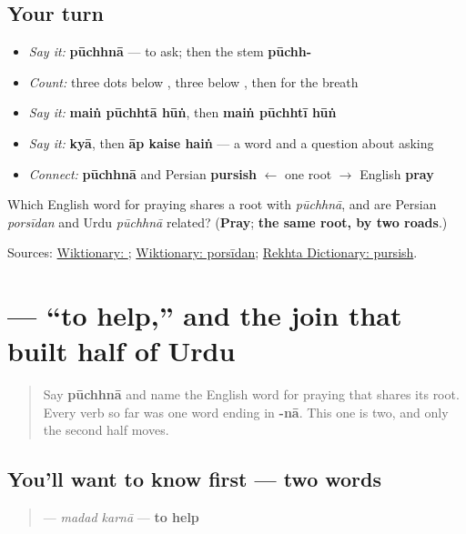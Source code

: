 \subsection*{Your turn}
\begin{itemize}
\raggedright
  \item \emph{Say it:} \textbf{pūchhnā} — to ask; then the stem \textbf{pūchh-}
  \item \emph{Count:} three dots below \textbf{}, three below \textbf{}, then \textbf{} for the breath
  \item \emph{Say it:} \textbf{maiṅ pūchhtā hūṅ}, then \textbf{maiṅ pūchhtī hūṅ}
  \item \emph{Say it:} \textbf{kyā}, then \textbf{āp kaise haiṅ} — a word and a question about asking
  \item \emph{Connect:} \textbf{pūchhnā} and Persian \textbf{pursish} $\leftarrow$ one root $\to$ English \textbf{pray}
\end{itemize}

\begin{tcolorbox}[breakable,colback=teal!4,colframe=teal!35!black,title={Before you move on}]
Which English word for praying shares a root with \emph{pūchhnā}, and are Persian \emph{porsīdan} and Urdu \emph{pūchhnā} related? (\textbf{Pray}; \textbf{the same root, by two roads}.)

Sources: \href{https://en.wiktionary.org/wiki/\%D9\%BE\%D9\%88\%DA\%86\%DA\%BE\%D9\%86\%D8\%A7}{Wiktionary: }; \href{https://en.wiktionary.org/wiki/\%D9\%BE\%D8\%B1\%D8\%B3\%DB\%8C\%D8\%AF\%D9\%86}{Wiktionary: porsīdan}; \href{https://www.rekhtadictionary.com/meaning-of-pursish}{Rekhta Dictionary: pursish}.
\end{tcolorbox}
\section[\texorpdfstring{\ur{مدد} \ur{کرنا} (madad karnā)}{مدد کرنا (madad karnā)}]{  — “to help,” and the join that built half of Urdu}

\label{lesson:UR-C08-madad}



\begin{quote}
Say \textbf{pūchhnā} and name the English word for praying that shares its root. Every verb so far was one word ending in \textbf{-nā}. This one is two, and only the second half moves.
\end{quote}

\subsection*{You'll want to know first — two words}
\begin{quote}
\textbf{ } — \emph{madad karnā} — \textbf{to help}
\end{quote}

